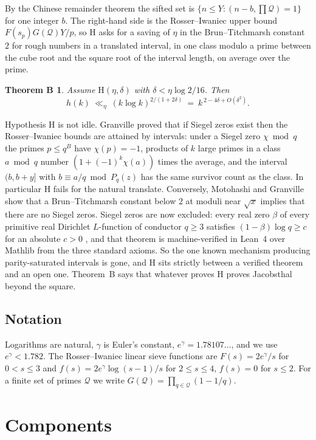 \documentclass[11pt]{amsart}
\newtheorem*{theoremB}{Theorem B}
\begin{document}
By the Chinese remainder theorem the sifted set is $\{n\le Y:(n-b,\prod\mathcal Q)=1\}$ for one integer $b$. The right-hand side is the Rosser--Iwaniec upper bound $F(s_p)G(\mathcal Q)Y/p$, so $\mathrm H$ asks for a saving of $\eta$ in the Brun--Titchmarsh constant $2$ for rough numbers in a translated interval, in one class modulo a prime between the cube root and the square root of the interval length, on average over the prime.

\begin{theoremB}
Assume $\mathrm H(\eta,\delta)$ with $\delta<\eta\log2/16$. Then
\[
h(k)\ \ll_\eta\ (k\log k)^{2/(1+2\delta)}\ =\ k^{\,2-4\delta+O(\delta^2)}.
\]
\end{theoremB}

Hypothesis $\mathrm H$ is not idle. Granville \cite{Gra} proved that if Siegel zeros exist then the Rosser--Iwaniec bounds are attained by intervals: under a Siegel zero $\chi\bmod q$ the primes $p\le q^{B}$ have $\chi(p)=-1$, products of $k$ large primes in a class $a\bmod q$ number $(1+(-1)^k\chi(a))$ times the average, and the interval $(b,b+y]$ with $b\equiv a/q\bmod P_q(z)$ has the same survivor count as the class. In particular $\mathrm H$ fails for the natural translate. Conversely, Motohashi \cite{Mot} and Granville \cite[Prop.~2]{Gra} show that a Brun--Titchmarsh constant below $2$ at moduli near $\sqrt x$ implies that there are no Siegel zeros. Siegel zeros are now excluded: every real zero $\beta$ of every primitive real Dirichlet $L$-function of conductor $q\ge3$ satisfies $(1-\beta)\log q\ge c$ for an absolute $c>0$ \cite{OAISiegel}, and that theorem is machine-verified in Lean~4 over Mathlib from the three standard axioms. So the one known mechanism producing parity-saturated intervals is gone, and $\mathrm H$ sits strictly between a verified theorem and an open one. Theorem~B says that whatever proves $\mathrm H$ proves Jacobsthal beyond the square.

\subsection*{Notation}
Logarithms are natural, $\gamma$ is Euler's constant, $e^{\gamma}=1.78107\ldots$, and we use $e^\gamma<1.782$. The Rosser--Iwaniec linear sieve functions are $F(s)=2e^{\gamma}/s$ for $0<s\le3$ and $f(s)=2e^{\gamma}\log(s-1)/s$ for $2\le s\le4$, $f(s)=0$ for $s\le2$. For a finite set of primes $\mathcal Q$ we write $G(\mathcal Q)=\prod_{q\in\mathcal Q}(1-1/q)$.

\section{Components}
\end{document}
